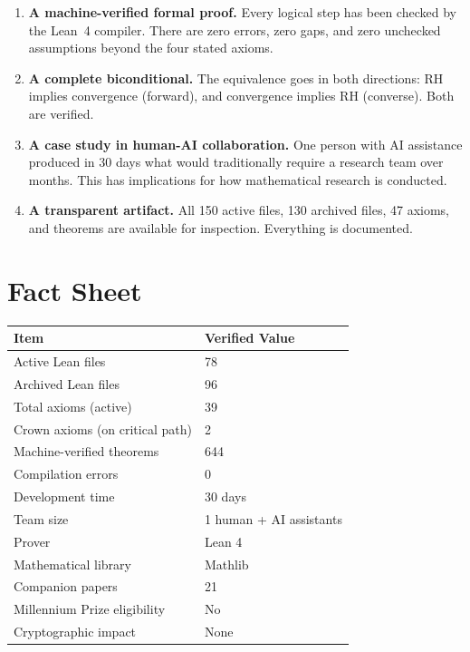 \documentclass[11pt,a4paper]{article}
\begin{document}
\begin{enumerate}
  \item \textcolor{correct}{\textbf{A machine-verified formal
    proof.}} Every logical step has been checked by the Lean~4
    compiler. There are zero errors, zero gaps, and zero
    unchecked assumptions beyond the four stated axioms.

  \item \textcolor{correct}{\textbf{A complete biconditional.}}
    The equivalence goes in both directions: RH implies convergence
    (forward), and convergence implies RH (converse). Both are
    verified.

  \item \textcolor{correct}{\textbf{A case study in human-AI
    collaboration.}} One person with AI assistance produced in
    30 days what would traditionally require a research team over
    months. This has implications for how mathematical research
    is conducted.

  \item \textcolor{correct}{\textbf{A transparent artifact.}}
    All 150 active files, 130 archived files, 47 axioms, and
    theorems are available for inspection. Everything is
    documented.
\end{enumerate}

\section{Fact Sheet}

\begin{center}
\begin{tabular}{@{}ll@{}}
\toprule
\textbf{Item} & \textbf{Verified Value} \\
\midrule
Active Lean files & 78 \\
Archived Lean files & 96 \\
Total axioms (active) & 39 \\
Crown axioms (on critical path) & 2 \\
Machine-verified theorems & 644 \\
Compilation errors & 0 \\
Development time & 30 days \\
Team size & 1 human + AI assistants \\
Prover & Lean 4 \\
Mathematical library & Mathlib \\
Companion papers & 21 \\
Millennium Prize eligibility & No \\
Cryptographic impact & None \\
\bottomrule
\end{tabular}
\end{center}
\end{document}
